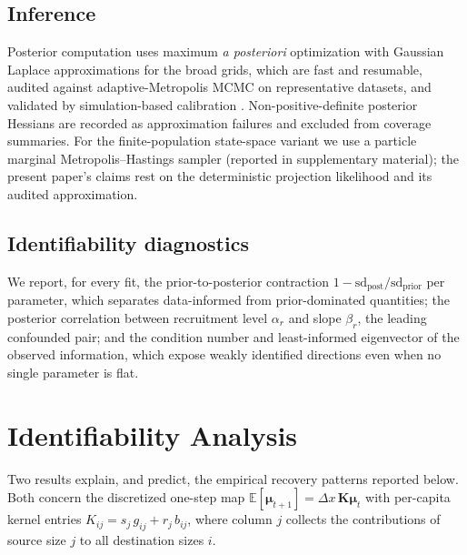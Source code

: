\documentclass[11pt]{article}
\newcommand{\E}{\mathbb{E}}
\begin{document}
\subsection{Inference}
Posterior computation uses maximum \emph{a posteriori} optimization with Gaussian
Laplace approximations for the broad grids, which are fast and resumable, audited
against adaptive-Metropolis MCMC on representative datasets, and validated by
simulation-based calibration \citep{cook2006,talts2018}. Non-positive-definite
posterior Hessians are recorded as approximation failures and excluded from
coverage summaries. For the finite-population state-space variant we use a
particle marginal Metropolis--Hastings sampler (reported in supplementary
material); the present paper's claims rest on the deterministic projection
likelihood and its audited approximation.

\subsection{Identifiability diagnostics}
We report, for every fit, the prior-to-posterior contraction
$1-\mathrm{sd}_{\text{post}}/\mathrm{sd}_{\text{prior}}$ per parameter, which
separates data-informed from prior-dominated quantities; the posterior
correlation between recruitment level $\alpha_r$ and slope $\beta_r$, the leading
confounded pair; and the condition number and least-informed eigenvector of the
observed information, which expose weakly identified directions even when no
single parameter is flat.

\section{Identifiability Analysis}
\label{sec:ident}

Two results explain, and predict, the empirical recovery patterns reported
below. Both concern the discretized one-step map
$\E[\boldsymbol{\mu}_{t+1}]=\Delta x\,\mathbf{K}\boldsymbol{\mu}_t$ with per-capita
kernel entries $K_{ij}=s_j\,g_{ij}+r_j\,b_{ij}$, where column $j$ collects the
contributions of source size $j$ to all destination sizes $i$.
\end{document}
